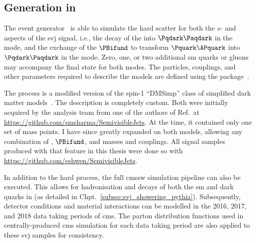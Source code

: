



\subsection{Generation in \texorpdfstring{\MADGRAPH}{MadGraph}}
\label{subsec:svj_signal_madgraph}

The \MADGRAPHFULL event generator~\cite{Alwall:2011madgraph} is able to simulate the hard scatter for both the $s$- and \tchannel aspects of the \gls{svj} signal, i.e., the decay of the \PZprime into $\Pqdark\Paqdark$ in the \schannel mode, and the exchange of the $\PBifund$ to transform $\Pquark\APquark$ into $\Pqdark\Paqdark$ in the \tchannel mode. Zero, one, or two additional \acrlong{sm} quarks or gluons may accompany the final state for both modes. The particles, couplings, and other parameters required to describe the models are defined using the \FEYNRULES package~\cite{Alloul:2013bka}.

The \schannel process is a modified version of the spin-1 ``DMSimp'' class of simplified dark matter models~\cite{Backovic:2015soa}. The \tchannel description is completely custom. Both were initially acquired by the analysis team from one of the authors of Ref.~at \url{https://github.com/smsharma/SemivisibleJets}. At the time, it contained only one set of mass points. I have since greatly expanded on both models, allowing any combination of \PZprime, $\PBifund$, and \Pqdark masses and couplings. All signal samples produced with \MADGRAPH that feature in this thesis were done so with \url{https://github.com/eshwen/SemivisibleJets}. %

In addition to the hard process, the full \acrshort{cmssw} simulation pipeline can also be executed. This allows for hadronisation and decays of both the \acrshort{sm} and dark quarks in \PYTHIA (as detailed in Chpt.~\ref{subsec:svj_showering_pythia}). Subsequently, detector conditions and material interactions can be modelled in the 2016, 2017, and 2018 data taking periods of \acrshort{cms}. The parton distribution functions used in centrally-produced \acrshort{cms} simulation for each data taking period are also applied to these \gls{svj} samples for consistency.

